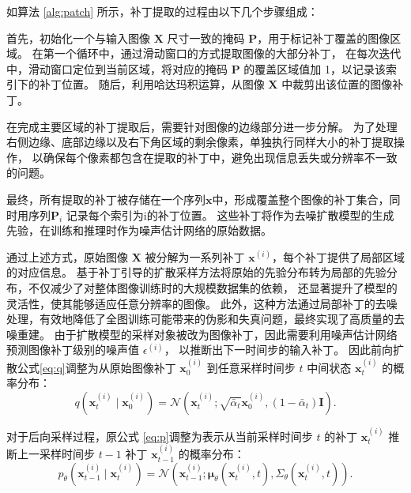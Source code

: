 如算法 \ref{alg:patch} 所示，补丁提取的过程由以下几个步骤组成：

首先，初始化一个与输入图像 $\bm{X}$ 尺寸一致的掩码 $\bm{P}$，用于标记补丁覆盖的图像区域。
在第一个循环中，通过滑动窗口的方式提取图像的大部分补丁，
在每次迭代中，滑动窗口定位到当前区域，将对应的掩码 $\bm{P}$ 的覆盖区域值加 1，以记录该索引下的补丁位置。
随后，利用哈达玛积运算，从图像 $\bm{X}$ 中裁剪出该位置的图像补丁。

在完成主要区域的补丁提取后，需要针对图像的边缘部分进一步分解。
为了处理右侧边缘、底部边缘以及右下角区域的剩余像素，单独执行同样大小的补丁提取操作，
以确保每个像素都包含在提取的补丁中，避免出现信息丢失或分辨率不一致的问题。

最终，所有提取的补丁被存储在一个序列$\mathbf{x}$中，形成覆盖整个图像的补丁集合，同时用序列$\bm{P}_i$ 记录每个索引为i的补丁位置。
这些补丁将作为去噪扩散模型的生成先验，在训练和推理时作为噪声估计网络的原始数据。


通过上述方式，原始图像 $\bm{X}$ 被分解为一系列补丁 ${\mathbf{x}^{(i)}}$，每个补丁提供了局部区域的对应信息。
基于补丁引导的扩散采样方法将原始的先验分布转为局部的先验分布，不仅减少了对整体图像训练时的大规模数据集的依赖，
还显著提升了模型的灵活性，使其能够适应任意分辨率的图像。
此外，这种方法通过局部补丁的去噪处理，有效地降低了全图训练可能带来的伪影和失真问题，最终实现了高质量的去噪重建。
由于扩散模型的采样对象被改为图像补丁，因此需要利用噪声估计网络预测图像补丁级别的噪声值 $\epsilon^{(i)}$，
以推断出下一时间步的输入补丁。
因此前向扩散公式\eqref{eq:q}调整为从原始图像补丁 $\mathbf{x}^{(i)}_0$ 到任意采样时间步 $t$ 中间状态 $\mathbf{x}^{(i)}_t$ 的概率分布：
\begin{equation}
    \label{eq:q-patch}
        q\left(\mathbf{x}^{(i)}_t \mid \mathbf{x}^{(i)}_0\right)=\mathcal{N}\left(\mathbf{x}^{(i)}_t ; \sqrt{\bar{\alpha}_t} \mathbf{x}^{(i)}_0,\left(1-\bar{\alpha}_t\right) \mathbf{I}\right).
\end{equation}

对于后向采样过程，原公式 \eqref{eq:p}调整为表示从当前采样时间步 $t$ 的补丁 $\mathbf{x}^{(i)}_t$ 推断上一采样时间步 $t-1$ 补丁 $\mathbf{x}^{(i)}_{t-1}$ 的概率分布：
\begin{equation}
    \label{eq:p-patch}
    p_\theta\left(\mathbf{x}^{(i)}_{t-1} \mid \mathbf{x}^{(i)}_t\right) =\mathcal{N}\left(\mathbf{x}^{(i)}_{t-1} ; \boldsymbol{\mu}_\theta\left(\mathbf{x}^{(i)}_t, t\right), \Sigma_\theta\left(\mathbf{x}^{(i)}_t, t\right)\right).
\end{equation}


